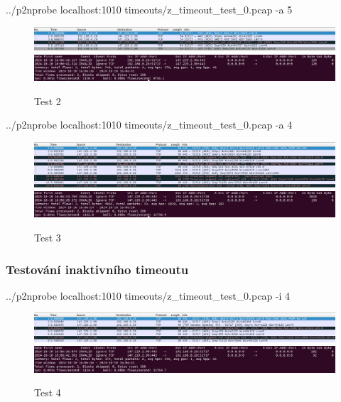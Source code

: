 \documentclass[11pt, a4paper, hidelinks]{article}[08.10.2023]
\begin{document}
    \begin{center}
        ../p2nprobe localhost:1010 timeouts/z\_timeout\_test\_0.pcap -a 5
    \end{center}
    \vspace{1cm}
    \begin{figure}[H]
        \centering
        \includegraphics[width=1\linewidth]{pictures/test_2_data.png}
        \includegraphics[width=1\linewidth]{pictures/test_2_res.png}
        \caption{Test 2}
    \end{figure}

    \begin{center}
        ../p2nprobe localhost:1010 timeouts/z\_timeout\_test\_0.pcap -a 4
    \end{center}
    \vspace{1cm}
    \begin{figure}[H]
        \centering
        \includegraphics[width=1\linewidth]{pictures/test_3_data.png}
        \includegraphics[width=1\linewidth]{pictures/test_3_res.png}
        \caption{Test 3}
    \end{figure}

    \subsubsection{Testování inaktivního timeoutu}
    \begin{center}
        ../p2nprobe localhost:1010 timeouts/z\_timeout\_test\_0.pcap -i 4
    \end{center}
    \begin{figure}[H]
        \centering
        \includegraphics[width=1\linewidth]{pictures/test_4_data.png}
        \includegraphics[width=1\linewidth]{pictures/test_4_res.png}
        \caption{Test 4}
    \end{figure}
\end{document}
